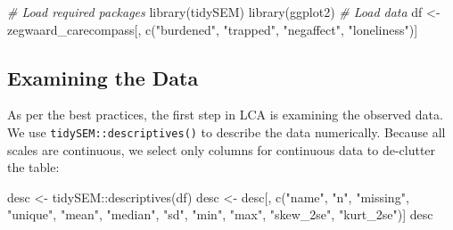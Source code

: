 \documentclass[
  man,floatsintext]{apa6}
\newenvironment{Shaded}{\begin{snugshade}}{\end{snugshade}}
\newcommand{\CommentTok}[1]{\textcolor[rgb]{0.56,0.35,0.01}{\textit{#1}}}
\newcommand{\FunctionTok}[1]{\textcolor[rgb]{0.00,0.00,0.00}{#1}}
\newcommand{\NormalTok}[1]{#1}
\newcommand{\OtherTok}[1]{\textcolor[rgb]{0.56,0.35,0.01}{#1}}
\newcommand{\SpecialCharTok}[1]{\textcolor[rgb]{0.00,0.00,0.00}{#1}}
\newcommand{\StringTok}[1]{\textcolor[rgb]{0.31,0.60,0.02}{#1}}
\begin{document}
\begin{Shaded}
\begin{Highlighting}[]
\CommentTok{\# Load required packages}
\FunctionTok{library}\NormalTok{(tidySEM)}
\FunctionTok{library}\NormalTok{(ggplot2)}
\CommentTok{\# Load data}
\NormalTok{df }\OtherTok{\textless{}{-}}\NormalTok{ zegwaard\_carecompass[, }\FunctionTok{c}\NormalTok{(}\StringTok{"burdened"}\NormalTok{, }\StringTok{"trapped"}\NormalTok{, }\StringTok{"negaffect"}\NormalTok{,}
    \StringTok{"loneliness"}\NormalTok{)]}
\end{Highlighting}
\end{Shaded}

\hypertarget{examining-the-data}{%
\subsection{Examining the Data}\label{examining-the-data}}

As per the best practices,
the first step in LCA is examining the observed data.
We use \texttt{tidySEM::descriptives()} to describe the data numerically.
Because all scales are continuous,
we select only columns for continuous data to de-clutter the table:

\begin{Shaded}
\begin{Highlighting}[]
\NormalTok{desc }\OtherTok{\textless{}{-}}\NormalTok{ tidySEM}\SpecialCharTok{::}\FunctionTok{descriptives}\NormalTok{(df)}
\NormalTok{desc }\OtherTok{\textless{}{-}}\NormalTok{ desc[, }\FunctionTok{c}\NormalTok{(}\StringTok{"name"}\NormalTok{, }\StringTok{"n"}\NormalTok{, }\StringTok{"missing"}\NormalTok{, }\StringTok{"unique"}\NormalTok{, }\StringTok{"mean"}\NormalTok{, }\StringTok{"median"}\NormalTok{,}
    \StringTok{"sd"}\NormalTok{, }\StringTok{"min"}\NormalTok{, }\StringTok{"max"}\NormalTok{, }\StringTok{"skew\_2se"}\NormalTok{, }\StringTok{"kurt\_2se"}\NormalTok{)]}
\NormalTok{desc}
\end{Highlighting}
\end{Shaded}
\end{document}
